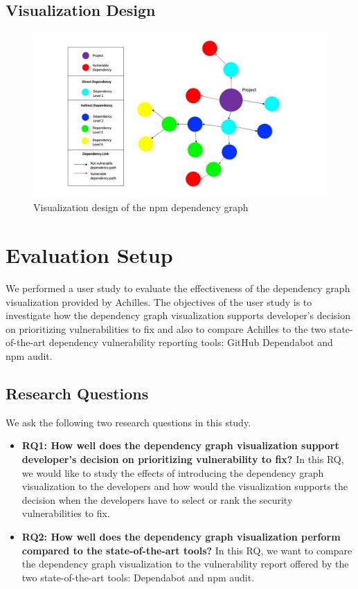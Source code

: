 \documentclass[conference]{IEEEtran}
\begin{document}
	
	\subsection{Visualization Design}
	
		\begin{figure}[tb]
		\centering
		\includegraphics[width=1.5\columnwidth]{Figures/Viz-concept-1.jpg}
		\caption{Visualization design of the npm dependency graph}
		\label{fig:viz-concept}
	\end{figure}
	
	\section{Evaluation Setup}
	We performed a user study to evaluate the effectiveness of the dependency graph visualization provided by Achilles.
	The objectives of the user study is to investigate how the dependency graph visualization supports developer’s decision on prioritizing vulnerabilities to fix and also to compare Achilles to the two state-of-the-art dependency vulnerability reporting tools: GitHub Dependabot and npm audit. 
	
	\subsection{Research Questions}
	We ask the following two research questions in this study.
	
	\begin{itemize}
		\item \textbf{RQ1: How well does the dependency graph visualization support developer’s decision on prioritizing vulnerability to fix?} In this RQ, we would like to study the effects of introducing the dependency graph visualization to the developers and how would the visualization supports the decision when the developers have to select or rank the security vulnerabilities to fix.
		\item \textbf{RQ2: How well does the dependency graph visualization perform compared to the state-of-the-art tools?} In this RQ, we want to compare the dependency graph visualization to the vulnerability report offered by the two state-of-the-art tools: Dependabot and npm audit.
	\end{itemize}
	
\end{document}
